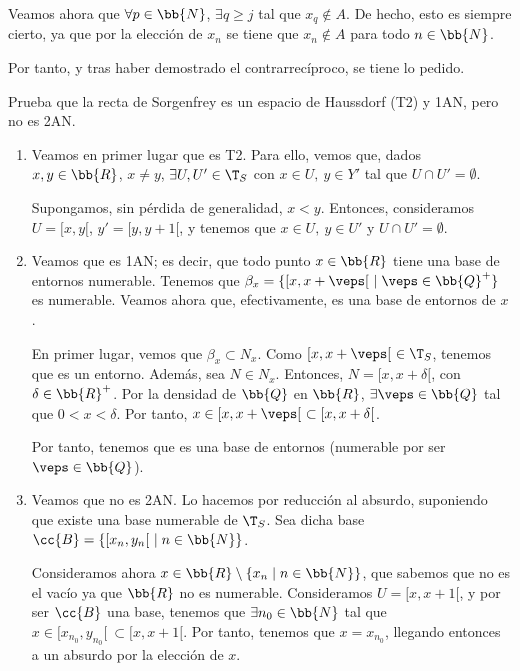 \begin{ejercicio}
\begin{enumerate}[label=\alph*)]
        Veamos ahora que $\forall p\in \bb{N}$, $\exists q\geq j$ tal que $x_q\notin A$. De hecho, esto es siempre cierto, ya que por la elección de $x_n$ se tiene que $x_n\notin A$ para todo $n\in \bb{N}$.

        Por tanto, y tras haber demostrado el contrarrecíproco, se tiene lo pedido.
    \end{enumerate}
\end{ejercicio}




\begin{ejercicio}
    Prueba que la recta de Sorgenfrey es un espacio de Haussdorf (T2) y 1AN, pero no es 2AN.

    \begin{enumerate}
        \item Veamos en primer lugar que es T2. Para ello, vemos que, dados $x,y\in \bb{R}$, $x\neq y$, $\exists U,U'\in \T_S$ con $x\in U,~ y\in Y'$ tal que $U\cap U'=\emptyset$.
    
        Supongamos, sin pérdida de generalidad, $x<y$. Entonces, consideramos $U=[x,y[$, $y'=[y,y+1[$, y tenemos que $x\in U,~y\in U'$ y $U\cap U'=\emptyset$.
    
        \item Veamos que es 1AN; es decir, que todo punto $x\in \bb{R}$ tiene una base de entornos numerable. Tenemos que $\beta_x=\{[x, x+\veps[~ \mid \veps\in \bb{Q}^+\}$ es numerable. Veamos ahora que, efectivamente, es una base de entornos de $x$.

        En primer lugar, vemos que $\beta_x\subset N_x$. Como $[x,x+\veps[~ \in\T_S$, tenemos que es un entorno. Además, sea $N\in N_x$. Entonces, $N=[x,x+\delta[$, con $\delta\in \bb{R}^+$. Por la densidad de $\bb{Q}$ en $\bb{R}$, $\exists \veps\in \bb{Q}$ tal que $0<x<\delta$. Por tanto, $x\in [x,x+\veps[~ \subset [x,x+\delta[$.
        
        Por tanto, tenemos que es una base de entornos (numerable por ser $\veps\in\bb{Q}$).

        \item Veamos que no es 2AN. Lo hacemos por reducción al absurdo, suponiendo que existe una base numerable de $\T_S$. Sea dicha base $\cc{B}=\{[x_n,y_n[~ \mid n\in \bb{N}\}$. 
        
        Consideramos ahora $x\in \bb{R}\setminus \{x_n\mid n\in \bb{N}\}$, que sabemos que no es el vacío ya que $\bb{R}$ no es numerable. Consideramos $U=[x,x+1[$, y por ser $\cc{B}$ una base, tenemos que $\exists n_0\in \bb{N}$ tal que $x\in [x_{n_0},y_{n_0}[~ \subset [x,x+1[$. Por tanto, tenemos que $x=x_{n_0}$, llegando entonces a un absurdo por la elección de $x$.
    \end{enumerate}
\end{ejercicio}

